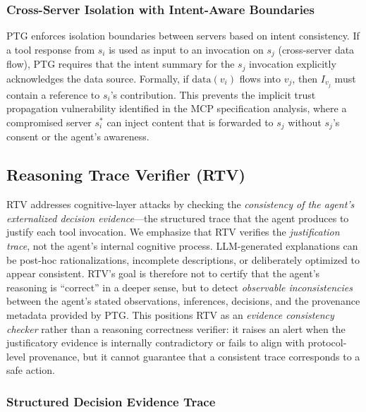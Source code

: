 \subsubsection{Cross-Server Isolation with Intent-Aware Boundaries}

PTG enforces isolation boundaries between servers based on intent consistency. If a tool response from $s_i$ is used as input to an invocation on $s_j$ (cross-server data flow), PTG requires that the intent summary for the $s_j$ invocation explicitly acknowledges the data source. Formally, if $\text{data}(v_i)$ flows into $v_j$, then $I_{v_j}$ must contain a reference to $s_i$'s contribution. This prevents the implicit trust propagation vulnerability identified in the MCP specification analysis, where a compromised server $s_i^{*}$ can inject content that is forwarded to $s_j$ without $s_j$'s consent or the agent's awareness.

\subsection{Reasoning Trace Verifier (RTV)}

RTV addresses cognitive-layer attacks by checking the \emph{consistency of the agent's externalized decision evidence}---the structured trace that the agent produces to justify each tool invocation. We emphasize that RTV verifies the \emph{justification trace}, not the agent's internal cognitive process. LLM-generated explanations can be post-hoc rationalizations, incomplete descriptions, or deliberately optimized to appear consistent. RTV's goal is therefore not to certify that the agent's reasoning is ``correct'' in a deeper sense, but to detect \emph{observable inconsistencies} between the agent's stated observations, inferences, decisions, and the provenance metadata provided by PTG. This positions RTV as an \emph{evidence consistency checker} rather than a reasoning correctness verifier: it raises an alert when the justificatory evidence is internally contradictory or fails to align with protocol-level provenance, but it cannot guarantee that a consistent trace corresponds to a safe action.

\subsubsection{Structured Decision Evidence Trace}

